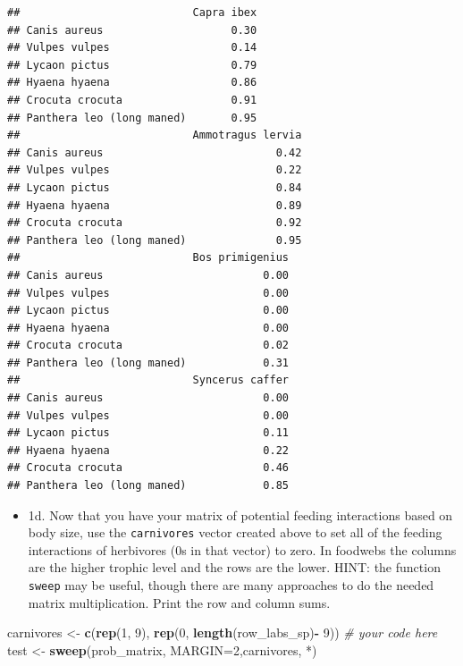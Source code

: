 \documentclass[
]{article}
\newenvironment{Shaded}{\begin{snugshade}}{\end{snugshade}}
\newcommand{\AttributeTok}[1]{\textcolor[rgb]{0.13,0.29,0.53}{#1}}
\newcommand{\CommentTok}[1]{\textcolor[rgb]{0.56,0.35,0.01}{\textit{#1}}}
\newcommand{\DecValTok}[1]{\textcolor[rgb]{0.00,0.00,0.81}{#1}}
\newcommand{\FunctionTok}[1]{\textcolor[rgb]{0.13,0.29,0.53}{\textbf{#1}}}
\newcommand{\NormalTok}[1]{#1}
\newcommand{\OtherTok}[1]{\textcolor[rgb]{0.56,0.35,0.01}{#1}}
\newcommand{\SpecialCharTok}[1]{\textcolor[rgb]{0.81,0.36,0.00}{\textbf{#1}}}
\newcommand{\StringTok}[1]{\textcolor[rgb]{0.31,0.60,0.02}{#1}}
\providecommand{\tightlist}{%
  \setlength{\itemsep}{0pt}\setlength{\parskip}{0pt}}
\begin{document}
\begin{verbatim}
##                           Capra ibex
## Canis aureus                    0.30
## Vulpes vulpes                   0.14
## Lycaon pictus                   0.79
## Hyaena hyaena                   0.86
## Crocuta crocuta                 0.91
## Panthera leo (long maned)       0.95
##                           Ammotragus lervia
## Canis aureus                           0.42
## Vulpes vulpes                          0.22
## Lycaon pictus                          0.84
## Hyaena hyaena                          0.89
## Crocuta crocuta                        0.92
## Panthera leo (long maned)              0.95
##                           Bos primigenius
## Canis aureus                         0.00
## Vulpes vulpes                        0.00
## Lycaon pictus                        0.00
## Hyaena hyaena                        0.00
## Crocuta crocuta                      0.02
## Panthera leo (long maned)            0.31
##                           Syncerus caffer
## Canis aureus                         0.00
## Vulpes vulpes                        0.00
## Lycaon pictus                        0.11
## Hyaena hyaena                        0.22
## Crocuta crocuta                      0.46
## Panthera leo (long maned)            0.85
\end{verbatim}

\begin{itemize}
\tightlist
\item
  1d. Now that you have your matrix of potential feeding interactions
  based on body size, use the \texttt{carnivores} vector created above
  to set all of the feeding interactions of herbivores (0s in that
  vector) to zero. In foodwebs the columns are the higher trophic level
  and the rows are the lower. HINT: the function \texttt{sweep} may be
  useful, though there are many approaches to do the needed matrix
  multiplication. Print the row and column sums.
\end{itemize}

\begin{Shaded}
\begin{Highlighting}[]
\NormalTok{carnivores }\OtherTok{\textless{}{-}} \FunctionTok{c}\NormalTok{(}\FunctionTok{rep}\NormalTok{(}\DecValTok{1}\NormalTok{, }\DecValTok{9}\NormalTok{), }\FunctionTok{rep}\NormalTok{(}\DecValTok{0}\NormalTok{, }\FunctionTok{length}\NormalTok{(row\_labs\_sp)}\SpecialCharTok{{-}} \DecValTok{9}\NormalTok{))}
\CommentTok{\# your code here}
\NormalTok{test }\OtherTok{\textless{}{-}} \FunctionTok{sweep}\NormalTok{(prob\_matrix, }\AttributeTok{MARGIN=}\DecValTok{2}\NormalTok{,carnivores, }\StringTok{\textasciigrave{}}\AttributeTok{*}\StringTok{\textasciigrave{}}\NormalTok{)}
\end{Highlighting}
\end{Shaded}
\end{document}

